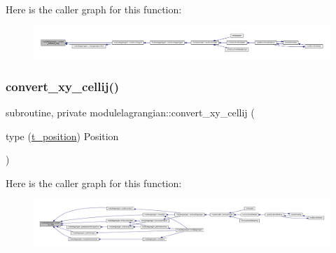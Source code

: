 Here is the caller graph for this function\+:\nopagebreak
\begin{figure}[H]
\begin{center}
\leavevmode
\includegraphics[width=350pt]{namespacemodulelagrangian_a7675e0420886642ca2fa921c21fdaca5_icgraph}
\end{center}
\end{figure}
\mbox{\label{namespacemodulelagrangian_ac9070324e55670920f08443dd42938d9}} 
\subsubsection{\texorpdfstring{convert\+\_\+xy\+\_\+cellij()}{convert\_xy\_cellij()}}
{\footnotesize\ttfamily subroutine, private modulelagrangian\+::convert\+\_\+xy\+\_\+cellij (\begin{DoxyParamCaption}\item[{type (\mbox{\hyperlink{structmodulelagrangian_1_1t__position}{t\+\_\+position}})}]{Position }\end{DoxyParamCaption})\hspace{0.3cm}{\ttfamily [private]}}

Here is the caller graph for this function\+:\nopagebreak
\begin{figure}[H]
\begin{center}
\leavevmode
\includegraphics[width=350pt]{namespacemodulelagrangian_ac9070324e55670920f08443dd42938d9_icgraph}
\end{center}
\end{figure}
\mbox{\label{namespacemodulelagrangian_a457d6182588e8e1d9cc86c35a53690f7}} 
